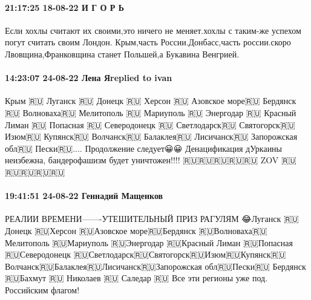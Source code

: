  
 
 
 
 

\paragraph{21:17:25 18-08-22 И Г О Р Ь}

Если хохлы считают их своими,это ничего не меняет.хохлы с таким-же успехом
погут считать своим Лондон. Крым,часть России.Донбасс,часть россии.скоро
Лвовщина,Франковщина станет Польшей,а Букавина Венгрией.

\paragraph{14:23:07 24-08-22 Лена Яreplied to ivan}

Крым 🇷🇺
Луганск 🇷🇺
Донецк 🇷🇺
Херсон 🇷🇺
Азовское море🇷🇺
Бердянск 🇷🇺
Волноваха🇷🇺
Мелитополь 🇷🇺
Мариуполь 🇷🇺
Энергодар 🇷🇺
Красный Лиман 🇷🇺
Попасная 🇷🇺
Северодонецк 🇷🇺
Светлодарск🇷🇺
Святогорск🇷🇺
Изюм🇷🇺
Купянск🇷🇺
Волчанск🇷🇺
Балаклея🇷🇺
Лисичанск🇷🇺
Запорожская обл🇷🇺
Пески🇷🇺....
Продолжение следует😀😀
Денацификация дУркаины неизбежна, бандерофашизм будет уничтожен!!!!
🇷🇺🇷🇺🇷🇺🇷🇺🇷🇺 ZOV 🇷🇺🇷🇺🇷🇺🇷🇺🇷🇺


\paragraph{19:41:51 24-08-22 Геннадий Мащенков}

РЕАЛИИ ВРЕМЕНИ-------УТЕШИТЕЛЬНЫЙ ПРИЗ РАГУЛЯМ 😂Луганск 🇷🇺Донецк 🇷🇺Херсон
🇷🇺Азовское море🇷🇺Бердянск 🇷🇺Волноваха🇷🇺Мелитополь 🇷🇺Мариуполь
🇷🇺Энергодар 🇷🇺Красный Лиман 🇷🇺Попасная 🇷🇺Северодонецк
🇷🇺Светлодарск🇷🇺Святогорск🇷🇺Изюм🇷🇺Купянск🇷🇺Волчанск🇷🇺Балаклея🇷🇺Лисичанск🇷🇺Запорожская
обл🇷🇺Пески🇷🇺 Бердянск 🇷🇺Бахмут 🇷🇺 Николаев 🇷🇺 Саледар 🇷🇺 Все эти
регионы уже под. Российским флагом!
